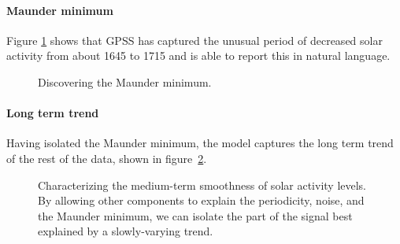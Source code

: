 \documentclass{article}
\begin{document}

\paragraph{Maunder minimum}

Figure \ref{fig:maunder} shows that GPSS has captured the unusual period of decreased solar activity from about 1645 to 1715 and is able to report this in natural language.

\begin{figure}[ht]
\centering
{}
\caption{Discovering the Maunder minimum.}
\label{fig:maunder}
\end{figure}

\paragraph{Long term trend}

Having isolated the Maunder minimum, the model captures the long term trend of the rest of the data, shown in figure~\ref{fig:smooth}.

\begin{figure}[h!]
\centering
{}
\caption{Characterizing the medium-term smoothness of solar activity levels.  By allowing other components to explain the periodicity, noise, and the Maunder minimum, we can isolate the part of the signal best explained by a slowly-varying trend.}
\label{fig:smooth}
\end{figure}
\end{document}
